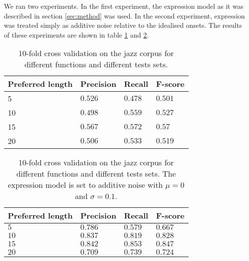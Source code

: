 We ran two experiments. In the first experiment, the expression model as it was described in section \ref{sec:method} was used. In the second experiment, expression was treated simply as additive noise relative to the idealised onsets. The results of these experiments are shown in table \ref{tab:results_expression} and \ref{tab:results_noise}.

\begin{table}
\centering
\caption{10-fold cross validation on the jazz corpus for different functions and different tests sets.}
\label{tab:results_expression}
\begin{tabular}{llll}
\hline
\textbf{Preferred length} & \textbf{Precision} & \textbf{Recall} & \textbf{F-score}\\
\hline
\hline
5 & $0.526$ & $0.478$ & $0.501$\\
10 & $0.498$ & $0.559$ & $0.527$\\
15 & $0.567$ & $0.572$ & $0.57$\\
20 & $0.506$ & $0.533$ & $0.519$\\
\hline

\end{tabular}
\end{table}

\begin{table}
\centering
\caption{10-fold cross validation on the jazz corpus for different functions and different tests sets. The expression model is set to additive noise with $\mu = 0$ and $\sigma = 0.1$.}
\label{tab:results_noise}
\begin{tabular}{llll}
\hline
\textbf{Preferred length} & \textbf{Precision} & \textbf{Recall} & \textbf{F-score}\\
\hline
\hline
$5$ & $0.786$ & $0.579$ & $0.667$\\
$10$ & $0.837$ & $0.819$ & $0.828$\\
$15$ & $0.842$ & $0.853$ & $0.847$\\
$20$ & $0.709$ & $0.739$ & $0.724$\\
\hline

\end{tabular}
\end{table}
